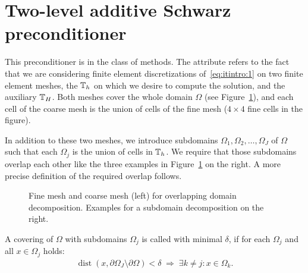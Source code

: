 \section{Two-level additive Schwarz preconditioner}

\begin{intro}
  This preconditioner is in the class of  methods. The attribute  refers
  to the fact that we are considering finite element discretizations
  of~\eqref{eq:itintro:1} on two finite element meshes, the
   $\mathbb T_h$ on which we desire to compute the
  solution, and the auxiliary  $\mathbb T_H$. Both
  meshes cover the whole domain $\Omega$ (see
  Figure~\ref{fig:schwarz:ddmeshes}), and each cell of the coarse mesh
  is the union of cells of the fine mesh ($4\times 4$ fine cells in
  the figure).

  In addition to these two meshes, we introduce subdomains
  $\Omega_1,\Omega_2,\dots,\Omega_J$ of $\Omega$ such that each
  $\Omega_j$ is the union of cells in $\mathbb T_h$. We require that those
  subdomains overlap each other like the three examples in
  Figure~\ref{fig:schwarz:ddmeshes} on the right. A more precise
  definition of the required overlap follows.
\end{intro}

\begin{figure}[tp]
  \centering
  \caption{Fine mesh and coarse mesh (left) for overlapping domain
    decomposition. Examples for a subdomain decomposition on the
    right.}
  \label{fig:schwarz:ddmeshes}
\end{figure}

\begin{definition}
  \label{definition:schwarz:overlap}
  A covering of $\Omega$ with subdomains $\Omega_j$ is called
   with minimal  $\delta$, if for
  each $\Omega_j$ and all $x\in\Omega_j$ holds:
  \begin{gather*}
    \operatorname{dist}(x,\partial\Omega_J\setminus\partial\Omega) <
    \delta\;
    \Rightarrow\; \exists k\neq j: x\in \Omega_k.
  \end{gather*}
\end{definition}

